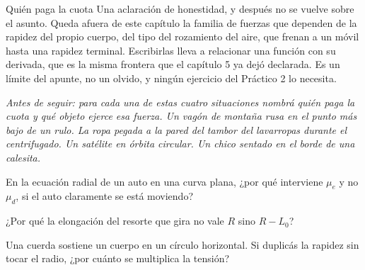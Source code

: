 \documentclass[11pt,openany]{book}
\begin{document}
\begin{bloque}{Quién paga la cuota}
Una aclaración de honestidad, y después no se vuelve sobre el asunto. Queda afuera de este capítulo la familia de fuerzas que dependen de la rapidez del propio cuerpo, del tipo del rozamiento del aire, que frenan a un móvil hasta una rapidez terminal. Escribirlas lleva a relacionar una función con su derivada, que es la misma frontera que el capítulo 5 ya dejó declarada. Es un límite del apunte, no un olvido, y ningún ejercicio del Práctico 2 lo necesita.

\textit{Antes de seguir: para cada una de estas cuatro situaciones nombrá quién paga la cuota y qué objeto ejerce esa fuerza. Un vagón de montaña rusa en el punto más bajo de un rulo. La ropa pegada a la pared del tambor del lavarropas durante el centrifugado. Un satélite en órbita circular. Un chico sentado en el borde de una calesita.}
\end{bloque}

\begin{chequeo}
\item En la ecuación radial de un auto en una curva plana, ¿por qué interviene $\mu_e$ y no $\mu_d$, si el auto claramente se está moviendo?
\item ¿Por qué la elongación del resorte que gira no vale $R$ sino $R - L_0$?
\item Una cuerda sostiene un cuerpo en un círculo horizontal. Si duplicás la rapidez sin tocar el radio, ¿por cuánto se multiplica la tensión?
\end{chequeo}
\end{document}
